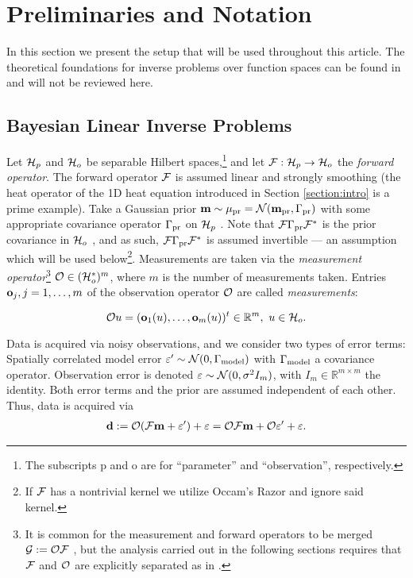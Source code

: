 \section{Preliminaries and Notation}\label{section:prelim}

In this section we present the setup that will be used throughout this
article. The theoretical foundations for inverse problems over
function spaces can be found in \cite{Stuart10} and will not be
reviewed here.


\subsection{Bayesian Linear Inverse Problems}\label{subsec:abstract OED}
Let $\mathcal{H}_p$ and $\mathcal{H}_o$ be separable Hilbert spaces,\footnote{The
subscripts p and o are for ``parameter'' and ``observation'',
respectively.} and let $\mathcal{F}: \mathcal{H}_p \to \mathcal{H}_o$ the \emph{forward
operator}. The forward operator $\mathcal{F}$ is assumed linear and strongly
smoothing (the heat operator of the 1D heat equation introduced in
Section \ref{section:intro} is a prime example). Take a Gaussian prior
$\mathbf{m} \sim \mu_{\textup{pr}} = \mathcal{N}(\mathbf{m}_{\textup{pr}} ,\Gamma_{\textup{pr}})$ with some appropriate
covariance operator $\Gamma_{\textup{pr}}$ on $\mathcal{H}_p$ \cite{Stuart10}. Note that
$\mathcal{F} \Gamma_{\textup{pr}} \mathcal{F}^*$ is the prior covariance in $\mathcal{H}_o$
\cite{Stuart10}, and as such, $\mathcal{F} \Gamma_{\textup{pr}} \mathcal{F}^*$ is assumed
invertible --- an assumption which will be used below\footnote{If
$\mathcal{F}$ has a nontrivial kernel we utilize Occam's Razor and ignore
said kernel.}. Measurements are taken via the \emph{measurement
operator}\footnote{It is common for the measurement and forward
operators to be merged $\mathcal{G} := \mathcal{O} \mathcal{F}$
\cite{AlexanderianGloorGhattas14}, but the analysis carried out in the
following sections requires that $\mathcal{F}$ and $\mathcal{O}$ are explicitly
separated as in \cite{attia2022stochastic, cvetkovic2023choosing}.}
$\mathcal{O} \in ( \mathcal{H}_o^* )^m$, where $m$ is the number of measurements
taken. Entries $\mathbf{o}_j, j=1,\dots,m$ of the observation operator
$\mathcal{O}$ are called \emph{measurements}:

\begin{equation*}%
  \obs u = (\meas_1(u), \dots, \meas_m(u) )^t \in \R^m,\ u \in \hilo.
\end{equation*}

Data is acquired via noisy observations, and we consider two types of
error terms: Spatially correlated model error $\varepsilon' \sim
\mathcal{N}(0,\Gamma_{\textup{model}})$ with $\Gamma_{\textup{model}}$ a covariance operator. Observation
error is denoted $\varepsilon \sim \mathcal{N}(0, \sigma^2 I_m)$, with $I_m \in
\mathbb{R}^{m \times m}$ the identity. Both error terms and the prior
are assumed independent of each other. Thus, data is acquired via
\begin{align}\label{eq:inverse problem}
  \data := \obs (\fwd \param + \eps') + \eps = \obs \fwd \param + \obs \eps' + \eps.
\end{align}

